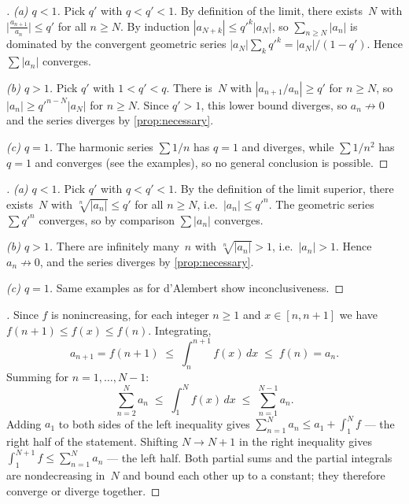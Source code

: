 \begin{proof}[]
\emph{(a) $q < 1$.} Pick $q'$ with $q < q' < 1$. By definition of the
limit, there exists~$N$ with
$\bigl|\tfrac{a_{n+1}}{a_n}\bigr| \le q'$ for all $n \ge N$. By
induction $|a_{N+k}| \le q'^k |a_N|$, so $\sum_{n \ge N} |a_n|$ is
dominated by the convergent geometric series
$|a_N| \sum_k q'^k = |a_N|/(1 - q')$. Hence $\sum |a_n|$ converges.

\emph{(b) $q > 1$.} Pick $q'$ with $1 < q' < q$. There is~$N$ with
$|a_{n+1}/a_n| \ge q'$ for $n \ge N$, so $|a_n| \ge q'^{n - N}|a_N|$
for $n \ge N$. Since $q' > 1$, this lower bound diverges, so
$a_n \not\to 0$ and the series diverges by
\cref{prop:necessary}.

\emph{(c) $q = 1$.} The harmonic series $\sum 1/n$ has $q = 1$ and
diverges, while $\sum 1/n^2$ has $q = 1$ and converges (see the
examples), so no general conclusion is possible.
\end{proof}

\begin{proof}[]
\emph{(a) $q < 1$.} Pick $q'$ with $q < q' < 1$. By the definition
of the limit superior, there exists~$N$ with $\sqrt[n]{|a_n|} \le q'$
for all $n \ge N$, i.e.\ $|a_n| \le q'^n$. The geometric series
$\sum q'^n$ converges, so by comparison $\sum |a_n|$ converges.

\emph{(b) $q > 1$.} There are infinitely many~$n$ with
$\sqrt[n]{|a_n|} > 1$, i.e.\ $|a_n| > 1$. Hence $a_n \not\to 0$, and
the series diverges by \cref{prop:necessary}.

\emph{(c) $q = 1$.} Same examples as for d'Alembert show
inconclusiveness.
\end{proof}

\begin{proof}[]
Since $f$ is nonincreasing, for each integer $n \ge 1$ and
$x \in [n, n+1]$ we have $f(n+1) \le f(x) \le f(n)$. Integrating,
\[
  a_{n+1} = f(n+1) \;\le\; \int_n^{n+1} f(x)\, dx \;\le\; f(n) = a_n.
\]
Summing for $n = 1, \dots, N - 1$:
\[
  \sum_{n=2}^{N} a_n \;\le\; \int_1^{N} f(x)\, dx \;\le\; \sum_{n=1}^{N-1} a_n.
\]
Adding $a_1$ to both sides of the left inequality gives
$\sum_{n=1}^{N} a_n \le a_1 + \int_1^N f$ — the right half of the
statement. Shifting $N \to N + 1$ in the right inequality gives
$\int_1^{N+1} f \le \sum_{n=1}^{N} a_n$ — the left half. Both
partial sums and the partial integrals are nondecreasing in~$N$ and
bound each other up to a constant; they therefore converge or diverge
together.
\end{proof}

